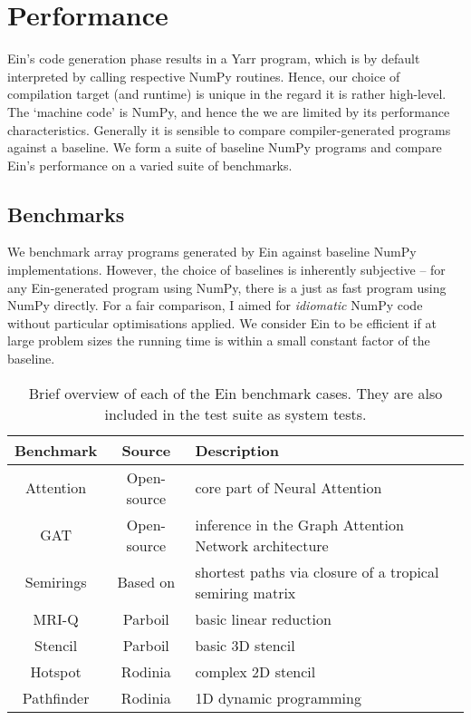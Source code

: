 \section{Performance}

Ein's code generation phase results in a Yarr program, which is by default interpreted by calling respective NumPy routines. 
Hence, our choice of compilation target (and runtime) is unique in the regard it is rather high-level.
The `machine code' is NumPy, and hence the we are limited by its performance characteristics. 
Generally it is sensible to compare compiler-generated programs against a baseline.
We form a suite of baseline NumPy programs and compare Ein's performance on a varied suite of benchmarks.

\subsection{Benchmarks}
\label{benchmarks}

We benchmark array programs generated by Ein against baseline NumPy implementations.
However, the choice of baselines is inherently subjective -- for any Ein-generated program using NumPy, there is a just as fast program using NumPy directly.
For a fair comparison, I aimed for \textit{idiomatic} NumPy code without particular optimisations applied.
We consider Ein to be efficient if at large problem sizes the running time is within a small constant factor of the baseline. 


\begin{table}
    \centering
    \begin{tabular}{c|c|l}
       \textbf{Benchmark} & \textbf{Source} & \textbf{Description} \\ \hline
        Attention & Open-source & core part of Neural Attention \\
        GAT & Open-source & inference in the Graph Attention Network architecture \\
        Semirings & Based on \textcite{dolan2013fun} & shortest paths via closure of a tropical semiring matrix \\
        MRI-Q & Parboil & basic linear reduction \\
        Stencil & Parboil & basic 3D stencil \\
        Hotspot & Rodinia & complex 2D stencil \\
        Pathfinder & Rodinia & 1D dynamic programming 
    \end{tabular}
    \caption{Brief overview of each of the Ein benchmark cases. They are also included in the test suite as system tests.}
    \label{tab:benchmarks}
\end{table}


